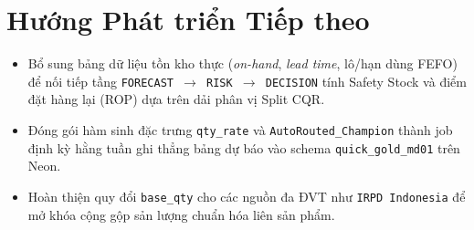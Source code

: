\section{Hướng Phát triển Tiếp theo}
\begin{itemize}[leftmargin=1.5em]
  \item Bổ sung bảng dữ liệu tồn kho thực (\textit{on-hand}, \textit{lead time}, lô/hạn dùng FEFO) để nối tiếp tầng \texttt{FORECAST $\rightarrow$ RISK $\rightarrow$ DECISION} tính Safety Stock và điểm đặt hàng lại (ROP) dựa trên dải phân vị Split CQR.
  \item Đóng gói hàm sinh đặc trưng \texttt{qty\_rate} và \texttt{AutoRouted\_Champion} thành job định kỳ hằng tuần ghi thẳng bảng dự báo vào schema \texttt{quick\_gold\_md01} trên Neon.
  \item Hoàn thiện quy đổi \texttt{base\_qty} cho các nguồn đa ĐVT như \texttt{IRPD Indonesia} để mở khóa cộng gộp sản lượng chuẩn hóa liên sản phẩm.
\end{itemize}
